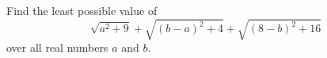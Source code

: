 Find the least possible value of
\[
\sqrt{a^2+9}+\sqrt{(b-a)^2+4}+\sqrt{(8-b)^2+16}
\]
over all real numbers $a$ and $b$.
